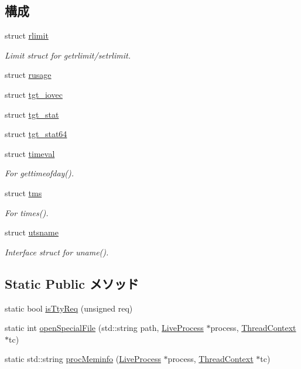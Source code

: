 \subsection*{構成}
\begin{DoxyCompactItemize}
\item 
struct \hyperlink{structLinux_1_1rlimit}{rlimit}
\begin{DoxyCompactList}\small\item\em Limit struct for getrlimit/setrlimit. \item\end{DoxyCompactList}\item 
struct \hyperlink{structLinux_1_1rusage}{rusage}
\item 
struct \hyperlink{structLinux_1_1tgt__iovec}{tgt\_\-iovec}
\item 
struct \hyperlink{structLinux_1_1tgt__stat}{tgt\_\-stat}
\item 
struct \hyperlink{structLinux_1_1tgt__stat64}{tgt\_\-stat64}
\item 
struct \hyperlink{structLinux_1_1timeval}{timeval}
\begin{DoxyCompactList}\small\item\em For gettimeofday(). \item\end{DoxyCompactList}\item 
struct \hyperlink{structLinux_1_1tms}{tms}
\begin{DoxyCompactList}\small\item\em For times(). \item\end{DoxyCompactList}\item 
struct \hyperlink{structLinux_1_1utsname}{utsname}
\begin{DoxyCompactList}\small\item\em Interface struct for uname(). \item\end{DoxyCompactList}\end{DoxyCompactItemize}
\subsection*{Static Public メソッド}
\begin{DoxyCompactItemize}
\item 
static bool \hyperlink{classLinux_ab20bdd4422ecf6e1736a5587be296b3f}{isTtyReq} (unsigned req)
\item 
static int \hyperlink{classLinux_a4d991052a0ab25e074acd669d8570c30}{openSpecialFile} (std::string path, \hyperlink{classLiveProcess}{LiveProcess} $\ast$process, \hyperlink{classThreadContext}{ThreadContext} $\ast$tc)
\item 
static std::string \hyperlink{classLinux_a01194ef4e453eb1292403de676b86dd9}{procMeminfo} (\hyperlink{classLiveProcess}{LiveProcess} $\ast$process, \hyperlink{classThreadContext}{ThreadContext} $\ast$tc)
\end{DoxyCompactItemize}
